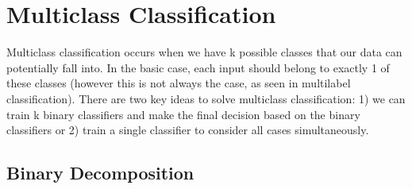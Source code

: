 \chapter{Multiclass Classification}

Multiclass classification occurs when we have k possible classes that our data can potentially fall into. In the basic case, each input should belong to exactly 1 of these classes (however this is not always the case, as seen in multilabel classification). There are two key ideas to solve multiclass classification: 1) we can train k binary classifiers and make the final decision based on the binary classifiers or 2) train a single classifier to consider all cases simultaneously. 

\section{Binary Decomposition}
